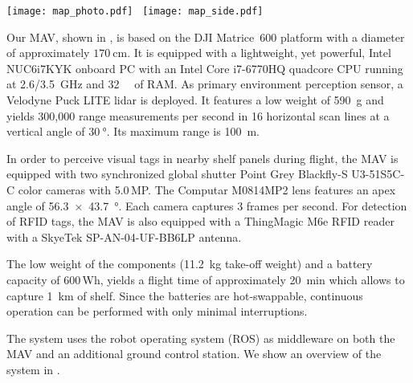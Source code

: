 \begin{figure*}[t]
  \centering
  \texttt{[image: map\_photo.pdf]}~ %
  \texttt{[image: map\_side.pdf]}~
  \vspace{-4.5ex}
  \caption{3D map from the initial manual flight. The top-down view (right) shows the dimensions of the acquired map of the \SI[product-units = single]{100 x 60}{\meter} warehouse. The camera perspective is highlighted in green. The warehouse contains tight, self-repetitive, and cluttered structures like shelves and stock, and larger, far-away structures like walls. For robust localization, the MAV has to employ a map of the structure of the large building.}
  \label{fig:mapping}
  \vspace{-3ex}
\end{figure*}

Our MAV, shown in , is based on the DJI Matrice~600 platform with a diameter of approximately $\SI{170}{\centi\meter}$. It is equipped with a lightweight, yet powerful, Intel NUC6i7KYK onboard PC with an Intel Core i7-6770HQ quadcore CPU running at \SI{2.6/3.5}{\giga\hertz} and \SI{32}{\giga\byte} of RAM.
As primary environment perception sensor, a Velodyne Puck LITE lidar is deployed. It features a low weight of \SI{590}{\gram} and yields 300,000 range measurements per second in 16 horizontal scan lines at a vertical angle of $\SI{30}{\degree}$. Its maximum range is \SI{100}{\meter}.

In order to perceive visual tags in nearby shelf panels during flight, the MAV is equipped with two synchronized global shutter Point Grey Blackfly-S U3-51S5C-C color cameras with 5.0\,MP. The Computar M0814MP2 lens features an apex angle of \SI[product-units = single]{56,3 x 43,7}{\degree}. Each camera captures 3 frames per second. For detection of RFID tags, the MAV is also equipped with a ThingMagic M6e RFID reader with a SkyeTek SP-AN-04-UF-BB6LP antenna.

The low weight of the components (\SI{11.2}{\kilo\gram} take-off weight) and a battery capacity of 600\,Wh, yields a flight time of approximately \SI{20}{\minute} which allows to capture \SI{1}{\kilo\meter} of shelf. Since the batteries are hot-swappable, continuous operation can be performed with only minimal interruptions.

The system uses the robot operating system (ROS) as middleware on both the MAV and an additional ground control station. We show an overview of the system in .
